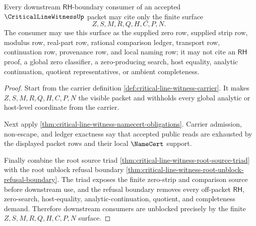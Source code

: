 \begin{theorem}
\label{thm:critical-line-witness-downstream-consumer-unblock}
Every downstream $\mathsf{RH}$-boundary consumer of an accepted
$\CriticalLineWitnessUp$ packet may cite only the finite surface
$$
Z,S,M,R,Q,H,C,P,N .
$$
The consumer may use this surface as the supplied zero row, supplied strip row,
modulus row, real-part row, rational comparison ledger, transport row,
continuation row, provenance row, and local naming row; it may not cite an
$\mathsf{RH}$ proof, a global zero classifier, a zero-producing search, host
equality, analytic continuation, quotient representatives, or ambient
completeness.
\end{theorem}
\begin{proof}
Start from the carrier definition
\autoref{def:critical-line-witness-carrier}. It makes
$Z,S,M,R,Q,H,C,P,N$ the visible packet and withholds every global analytic or
host-level coordinate from the carrier.

Next apply \autoref{thm:critical-line-witness-namecert-obligations}. Carrier
admission, non-escape, and ledger exactness say that accepted public reads are
exhausted by the displayed packet rows and their local $\NameCert$ support.

Finally combine the root source triad
\autoref{thm:critical-line-witness-root-source-triad} with the root unblock
refusal boundary
\autoref{thm:critical-line-witness-root-unblock-refusal-boundary}. The triad
exposes the finite zero-strip and comparison source before downstream use, and
the refusal boundary removes every off-packet $\mathsf{RH}$, zero-search,
host-equality, analytic-continuation, quotient, and completeness demand.
Therefore downstream consumers are unblocked precisely by the finite
$Z,S,M,R,Q,H,C,P,N$ surface.
\end{proof}
